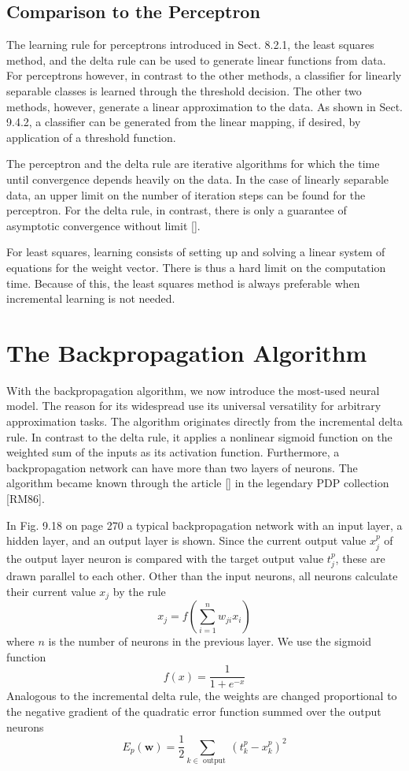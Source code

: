 \documentclass[10pt]{book}
\begin{document}
\subsection{Comparison to the Perceptron}
The learning rule for perceptrons introduced in Sect. 8.2.1, the least squares method, and the delta rule can be used to generate linear functions from data. For perceptrons however, in contrast to the other methods, a classifier for linearly separable classes is learned through the threshold decision. The other two methods, however, generate a linear approximation to the data. As shown in Sect. 9.4.2, a classifier can be generated from the linear mapping, if desired, by application of a threshold function.

The perceptron and the delta rule are iterative algorithms for which the time until convergence depends heavily on the data. In the case of linearly separable data, an upper limit on the number of iteration steps can be found for the perceptron. For the delta rule, in contrast, there is only a guarantee of asymptotic convergence without limit [\cite{hertz1991neural}].

For least squares, learning consists of setting up and solving a linear system of equations for the weight vector. There is thus a hard limit on the computation time. Because of this, the least squares method is always preferable when incremental learning is not needed.

\section{The Backpropagation Algorithm}
With the backpropagation algorithm, we now introduce the most-used neural model. The reason for its widespread use its universal versatility for arbitrary approximation tasks. The algorithm originates directly from the incremental delta rule. In contrast to the delta rule, it applies a nonlinear sigmoid function on the weighted sum of the inputs as its activation function. Furthermore, a backpropagation network can have more than two layers of neurons. The algorithm became known through the article [\cite{rumelhart1986bp}] in the legendary PDP collection [RM86].

In Fig. 9.18 on page 270 a typical backpropagation network with an input layer, a hidden layer, and an output layer is shown. Since the current output value $x_{j}^{p}$ of the output layer neuron is compared with the target output value $t_{j}^{p}$, these are drawn parallel to each other. Other than the input neurons, all neurons calculate their current value $x_{j}$ by the rule
\begin{equation*}
x_{j}=f\left(\sum_{i=1}^{n} w_{j i} x_{i}\right) \tag{9.14}
\end{equation*}
where $n$ is the number of neurons in the previous layer. We use the sigmoid function
$$
f(x)=\frac{1}{1+e^{-x}}
$$
Analogous to the incremental delta rule, the weights are changed proportional to the negative gradient of the quadratic error function summed over the output neurons
$$
E_{p}(\boldsymbol{w})=\frac{1}{2} \sum_{k \in \text { output }}\left(t_{k}^{p}-x_{k}^{p}\right)^{2}
$$
\end{document}
